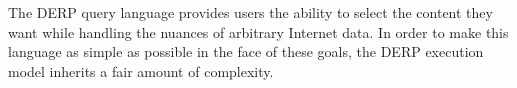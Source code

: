 The DERP query language provides users the ability to select the content they want while handling the nuances of arbitrary Internet data. In order to make this language as simple as possible in the face of these goals, the DERP execution model inherits a fair amount of complexity.
  
